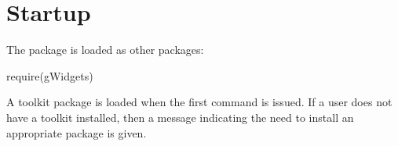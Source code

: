 



\section{Startup}
The  package is loaded as other \R\/ packages:
\begin{Schunk}
\begin{Sinput}
 require(gWidgets)
\end{Sinput}
\end{Schunk}

A toolkit package is loaded when the first command is issued. If a
user does not have a toolkit installed, then a message indicating the
need to install an appropriate package is given.

